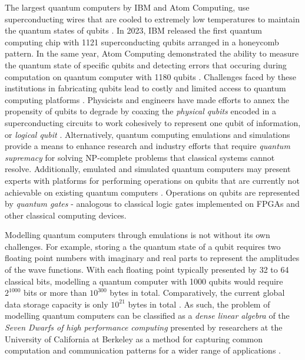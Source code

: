 The largest quantum computers by IBM and Atom Computing, use superconducting wires that are cooled to extremely low temperatures to maintain the quantum states of qubits \cite{wilkins2024record}. In 2023, IBM released the first quantum computing chip with 1121 superconducting qubits arranged in a honeycomb pattern. In the same year, Atom Computing demonstrated the ability to measure the quantum state of specific qubits and detecting errors that occuring during computation on quantum computer with 1180 qubits \cite{swayne2023atom}. Challenges faced by these institutions in fabricating qubits lead to costly and limited access to quantum computing platforms \cite{belfore2024scalable}. Physicists and engineers have made efforts to annex the propensity of qubits to degrade by coaxing the \textit{physical qubits} encoded in a superconducting circuits to work cohesively to represent one qubit of information, or \textit{logical qubit} \cite{castelvecchi2023ibm}. Alternatively, quantum computing emulations and simulations provide a means to enhance research and industry efforts that require \textit{quantum supremacy} for solving \gls{NP-complete} problems that classical systems cannot resolve. Additionally, emulated and simulated quantum computers may present experts with platforms for performing operations on qubits that are currently not achievable on existing quantum computers \cite{belfore2024scalable}. Operations on qubits are represented by \textit{quantum gates} - analogous to classical logic gates implemented on FPGAs and other classical computing devices. 

Modelling quantum computers through emulations is not without its own challenges. For example, storing a the quantum state of a qubit requires two floating point numbers with imaginary and real parts to represent the amplitudes of the wave functions. With each floating point typically presented by 32 to 64 classical bits, modelling a quantum computer with 1000 qubits would require $2^{1000}$ bits or more than $10^{300}$ bytes in total. Comparatively, the current global data storage capacity is only $10^{21}$ bytes in total \cite{taylor2023storage}. As such, the problem of modelling quantum computers can be classified as a \textit{dense linear algebra} of the \textit{Seven Dwarfs of high performance computing} presented by researchers at the University of California at Berkeley as a method for capturing common computation and communication patterns for a wider range of applications \cite{asanovic2006landscape}. 

